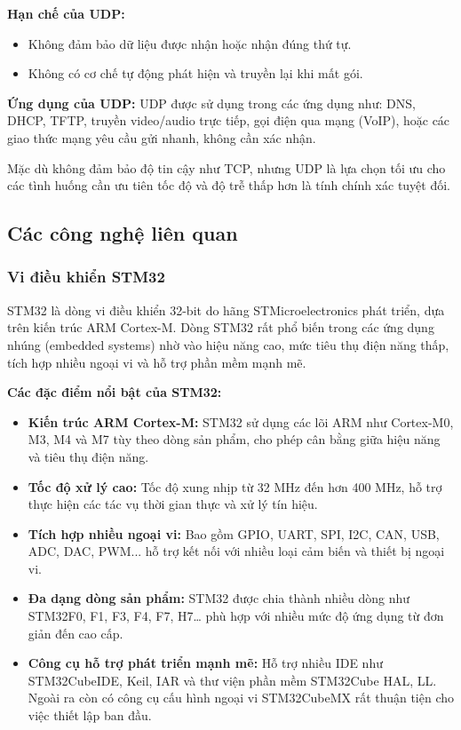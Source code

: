 \textbf{Hạn chế của UDP:}
\begin{itemize}
    \item Không đảm bảo dữ liệu được nhận hoặc nhận đúng thứ tự.
    \item Không có cơ chế tự động phát hiện và truyền lại khi mất gói.
\end{itemize}

\textbf{Ứng dụng của UDP:}
UDP được sử dụng trong các ứng dụng như: DNS, DHCP, TFTP, truyền video/audio trực tiếp, gọi điện qua mạng (VoIP), hoặc các giao thức mạng yêu cầu gửi nhanh, không cần xác nhận.

Mặc dù không đảm bảo độ tin cậy như TCP, nhưng UDP là lựa chọn tối ưu cho các tình huống cần ưu tiên tốc độ và độ trễ thấp hơn là tính chính xác tuyệt đối.

\subsection{Các công nghệ liên quan}

\subsubsection{Vi điều khiển STM32}

STM32\cite{st_rm_f4} là dòng vi điều khiển 32-bit do hãng STMicroelectronics phát triển, dựa trên kiến trúc ARM Cortex-M. Dòng STM32 rất phổ biến trong các ứng dụng nhúng (embedded systems) nhờ vào hiệu năng cao, mức tiêu thụ điện năng thấp, tích hợp nhiều ngoại vi và hỗ trợ phần mềm mạnh mẽ.

\textbf{Các đặc điểm nổi bật của STM32:}
\begin{itemize}
    \item \textbf{Kiến trúc ARM Cortex-M:} STM32 sử dụng các lõi ARM như Cortex-M0, M3, M4 và M7 tùy theo dòng sản phẩm, cho phép cân bằng giữa hiệu năng và tiêu thụ điện năng.
    
    \item \textbf{Tốc độ xử lý cao:} Tốc độ xung nhịp từ 32 MHz đến hơn 400 MHz, hỗ trợ thực hiện các tác vụ thời gian thực và xử lý tín hiệu.

    \item \textbf{Tích hợp nhiều ngoại vi:} Bao gồm GPIO, UART, SPI, I2C, CAN, USB, ADC, DAC, PWM... hỗ trợ kết nối với nhiều loại cảm biến và thiết bị ngoại vi.

    \item \textbf{Đa dạng dòng sản phẩm:} STM32 được chia thành nhiều dòng như STM32F0, F1, F3, F4, F7, H7… phù hợp với nhiều mức độ ứng dụng từ đơn giản đến cao cấp.

    \item \textbf{Công cụ hỗ trợ phát triển mạnh mẽ:} Hỗ trợ nhiều IDE như STM32CubeIDE, Keil, IAR và thư viện phần mềm STM32Cube HAL, LL. Ngoài ra còn có công cụ cấu hình ngoại vi STM32CubeMX rất thuận tiện cho việc thiết lập ban đầu.
\end{itemize}

